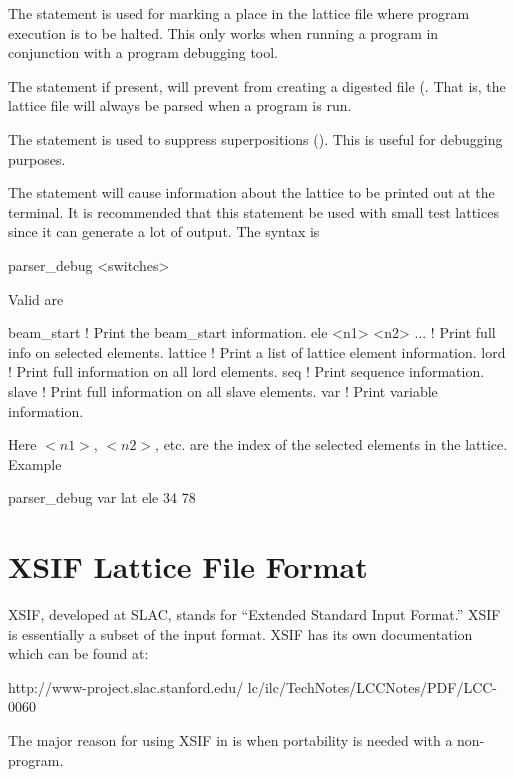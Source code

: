 {The  statement is used for marking a place in the lattice file
where program execution is to be halted. This only works when running
a program in conjunction with a program debugging tool. 

The  statement if present, will prevent \bmad from 
creating a digested file (. That is, the lattice file will always
be parsed when a program is run.

The  statement is used to suppress superpositions
(). This is useful for debugging purposes.

The  statement will cause information about the
lattice to be printed out at the terminal. It is recommended that this
statement be used with small test lattices since it can generate a lot
of output. The syntax is
\begin{example}
  parser_debug <switches>
\end{example}
Valid  are
\begin{example}
  beam_start          ! Print the beam_start information.
  ele <n1> <n2> ...   ! Print full info on selected elements.
  lattice             ! Print a list of lattice element information.
  lord                ! Print full information on all lord elements.
  seq                 ! Print sequence information.
  slave               ! Print full information on all slave elements.
  var                 ! Print variable information.
\end{example}
Here $<n1>$, $<n2>$, etc. are the index of the selected elements in
the lattice.  Example
\begin{example}
  parser_debug var lat ele 34 78
\end{example}

\section{XSIF Lattice File Format}
\label{s:xsif}

XSIF, developed at SLAC, stands for 
``Extended Standard Input Format.''
XSIF is essentially a subset of the \mad\cite{b:maduser} input format. 
XSIF has its own documentation which can be found at:
\begin{example}
  http://www-project.slac.stanford.edu/
              lc/ilc/TechNotes/LCCNotes/PDF/LCC-0060%
\end{example}
The major reason for using XSIF in \bmad is when portability is needed
with a non-\bmad program.

}
